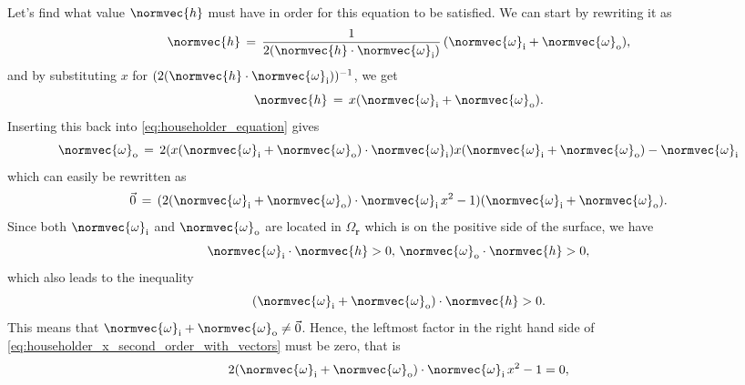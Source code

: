 Let's find what value $\normvec{h}$ must have in order for this equation to be satisfied. We can start by rewriting it as
%
\begin{equation}
\normvec{h} \,=\, \frac{1}{2(\normvec{h}\cdot\normvec{\omega}_{\text{i}})}\,(\normvec{\omega}_{\text{i}} + \normvec{\omega}_{\text{o}}),
\end{equation}
%
and by substituting $x$ for $(2(\normvec{h}\cdot\normvec{\omega}_{\text{i}}))^{-1}$, we get
%
\begin{equation} \label{eq:householder_equation_x_introduced}
\normvec{h} \,=\, x(\normvec{\omega}_{\text{i}} + \normvec{\omega}_{\text{o}}).
\end{equation}
%
Inserting this back into \eqref{eq:householder_equation} gives
%
\begin{equation}
\normvec{\omega}_{\text{o}} \,=\, 2(x(\normvec{\omega}_{\text{i}} + \normvec{\omega}_{\text{o}})\cdot\normvec{\omega}_{\text{i}})x(\normvec{\omega}_{\text{i}} + \normvec{\omega}_{\text{o}}) - \normvec{\omega}_{\text{i}}
\end{equation}
%
which can easily be rewritten as
%
\begin{equation} \label{eq:householder_x_second_order_with_vectors}
\vec{0} \,=\, (2(\normvec{\omega}_{\text{i}} + \normvec{\omega}_{\text{o}})\cdot\normvec{\omega}_{\text{i}}\,x^2 - 1)(\normvec{\omega}_{\text{i}} + \normvec{\omega}_{\text{o}}).
\end{equation}
%
Since both $\normvec{\omega}_{\text{i}}$ and $\normvec{\omega}_{\text{o}}$ are located in $\Omega_{\textbf{r}}$ which is on the positive side of the surface, we have
%
\begin{equation} \label{eq:reflection_direction_and_direction_against_light_source_on_positive_side_of_surface_separate}
\normvec{\omega}_{\text{i}}\cdot\normvec{h} > 0,\, \normvec{\omega}_{\text{o}}\cdot\normvec{h} > 0,
\end{equation}
%
which also leads to the inequality
%
\begin{equation} \label{eq:reflection_direction_and_direction_against_light_source_on_positive_side_of_surface_together}
(\normvec{\omega}_{\text{i}} + \normvec{\omega}_{\text{o}})\cdot\normvec{h} > 0.
\end{equation}
%
This means that $\normvec{\omega}_{\text{i}} + \normvec{\omega}_{\text{o}} \neq \vec{0}$. Hence, the leftmost factor in the right hand side of \eqref{eq:householder_x_second_order_with_vectors} must be zero, that is
%
\begin{equation}
2(\normvec{\omega}_{\text{i}} + \normvec{\omega}_{\text{o}})\cdot\normvec{\omega}_{\text{i}}\,x^2 - 1 = 0,
\end{equation}
